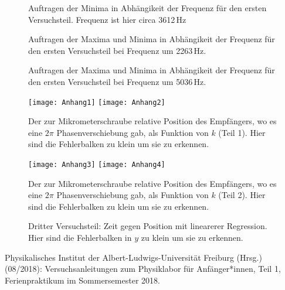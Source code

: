 \documentclass[11pt,a4paper]{article}
\begin{document}
\begin{figure}[p]
\centering
{}
\renewcommand\thefigure{4}
\caption[Auftragen der Minima in Abh\"angikeit der Frequenz f\"ur den ersten Versuchsteil]{Auftragen der Minima in Abh\"angikeit der Frequenz f\"ur den ersten Versuchsteil. Frequenz ist hier circa 3612\,Hz}
\label{Abb:4}
\end{figure}


\begin{figure}[p]
\centering
{}
\renewcommand\thefigure{5}
\caption[Auftragen der Maxima und Minima in Abh\"angikeit der Frequenz f\"ur den ersten Versuchsteil bei Frequenz um 5036 Hz]{Auftragen der Maxima und Minima in Abh\"angikeit der Frequenz f\"ur den ersten Versuchsteil bei Frequenz um 2263\,Hz.}
\label{Abb:5}
\end{figure}

\begin{figure}[p]
\centering
{}
\renewcommand\thefigure{6}
\caption[Auftragen der Maxima und Minima in Abh\"angikeit der Frequenz f\"ur den ersten Versuchsteil bei Frequenz um 5036 Hz]{Auftragen der Maxima und Minima in Abh\"angikeit der Frequenz f\"ur den ersten Versuchsteil bei Frequenz um 5036\,Hz.}
\label{Abb:6}
\end{figure}

\begin{figure}[p]
	\centering
	\texttt{[image: Anhang1]}
	\texttt{[image: Anhang2]}
	\caption{Der zur Mikrometerschraube relative Position des Empfängers, wo es eine $2\pi$ Phasenverschiebung gab, als Funktion von $k$ (Teil 1). Hier sind die Fehlerbalken zu klein um sie zu erkennen.}
\end{figure}
\begin{figure}
	\texttt{[image: Anhang3]}
	\texttt{[image: Anhang4]}
	\caption{Der zur Mikrometerschraube relative Position des Empfängers, wo es eine $2\pi$ Phasenverschiebung gab, als Funktion von $k$ (Teil 2). Hier sind die Fehlerbalken zu klein um sie zu erkennen.}
\end{figure}

\begin{figure}[p]
\centering
\fbox{\texttt{[image: 3xt]}}
\renewcommand\thefigure{8}
\caption[Dritter Versuchsteil: Zeit gegen Position mit linearerer Regression]{Dritter Versuchsteil: Zeit gegen Position mit linearerer Regression. Hier sind die Fehlerbalken in $y$ zu klein um sie zu erkennen.}
\label{Abb:8}
\end{figure}

\begin{thebibliography}{9}
 Physikalisches Institut der Albert-Ludwigs-Universität Freiburg (Hrsg.) (08/2018): Versuchsanleitungen zum Physiklabor für Anfänger*innen, Teil 1, Ferienpraktikum im Sommersemester 2018.
\end{thebibliography}
\end{document}
